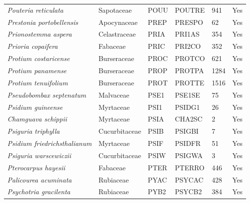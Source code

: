 \documentclass[11pt]{article}
\begin{document}
\begin{longtable}{@{}llllll@{}}
\textit{Pouteria reticulata}                          & Sapotaceae       & POUU   & POUTRE & 941             & Yes       \\
\textit{Prestonia portobellensis}                     & Apocynaceae      & PREP   & PRESPO & 62              & Yes       \\
\textit{Prionostemma aspera}                          & Celastraceae     & PRIA   & PRI1AS & 354             & Yes       \\
\textit{Prioria copaifera}                            & Fabaceae         & PRIC   & PRI2CO & 352             & Yes       \\
\textit{Protium costaricense}                         & Burseraceae      & PROC   & PROTCO & 621             & Yes       \\
\textit{Protium panamense}                            & Burseraceae      & PROP   & PROTPA & 1284            & Yes       \\
\textit{Protium tenuifolium}                          & Burseraceae      & PROT   & PROTTE & 1516            & Yes       \\
\textit{Pseudobombax septenatum}                      & Malvaceae        & PSE1   & PSE1SE & 75              & Yes       \\
\textit{Psidium guineense}                            & Myrtaceae        & PSI1   & PSIDG1 & 26              & Yes       \\
\textit{Chamguava schippii}                           & Myrtaceae        & PSIA   & CHA2SC & 2               & Yes       \\
\textit{Psiguria triphylla}                           & Cucurbitaceae    & PSIB   & PSIGBI & 7               & Yes       \\
\textit{Psidium friedrichsthalianum}                  & Myrtaceae        & PSIF   & PSIDFR & 51              & Yes       \\
\textit{Psiguria warscewiczii}                        & Cucurbitaceae    & PSIW   & PSIGWA & 3               & Yes       \\
\textit{Pterocarpus hayesii}                          & Fabaceae         & PTER   & PTERRO & 446             & Yes       \\
\textit{Palicourea acuminata}                         & Rubiaceae        & PYAC   & PSYCAC & 428             & Yes       \\
\textit{Psychotria gracilenta}                        & Rubiaceae        & PYB2   & PSYCB2 & 384             & Yes       \\

\end{longtable}
\end{document}
